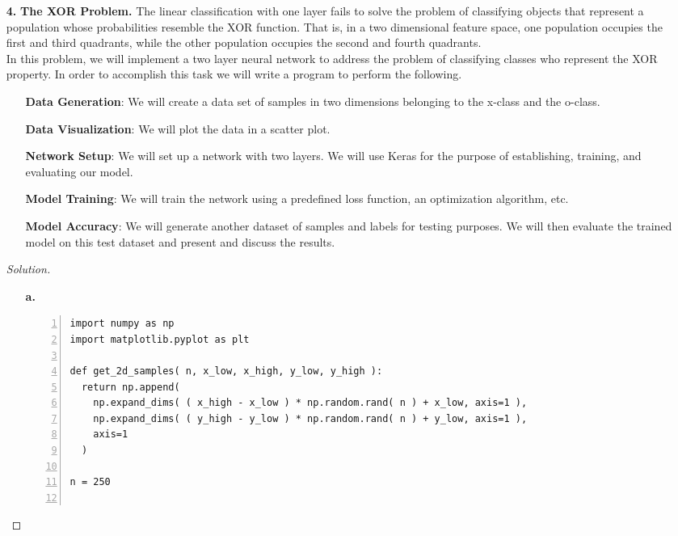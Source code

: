 \documentclass[ 12pt ]{article}
\begin{document}
\begin{enumerate}
	\item[\textbf{4.}] \textbf{The XOR Problem.} The linear classification with one layer fails to solve the problem of classifying objects that represent a population whose probabilities
		resemble the XOR function. That is, in a two dimensional feature space, one population occupies the first and third quadrants, while the other population occupies the second and
		fourth quadrants. \\
		In this problem, we will implement a two layer neural network to address the problem of classifying classes who represent the XOR property. In order to accomplish this task we
		will write a program to perform the following.
		\begin{enumerate}
			\item[] \textbf{Data Generation}: We will create a data set of samples in two dimensions belonging to the x-class and the o-class.
			\item[] \textbf{Data Visualization}: We will plot the data in a scatter plot.
			\item[] \textbf{Network Setup}: We will set up a network with two layers. We will use Keras for the purpose of establishing, training, and evaluating our model.
			\item[] \textbf{Model Training}: We will train the network using a predefined loss function, an optimization algorithm, etc.
			\item[] \textbf{Model Accuracy}: We will generate another dataset of samples and labels for testing purposes. We will then evaluate the trained model on this test dataset and
				present and discuss the results.
		\end{enumerate}

		\begin{proof}[Solution] $ $
			\begin{enumerate}
				\item[\textbf{a.}] $ $
					\begin{lstlisting}[basicstyle=\ttfamily\footnotesize, numbers=left, tabsize=4, frame=single, breaklines=true, postbreak=\mbox{\textcolor{red}{$\hookrightarrow$}\space}]
import numpy as np
import matplotlib.pyplot as plt

def get_2d_samples( n, x_low, x_high, y_low, y_high ):
  return np.append(
    np.expand_dims( ( x_high - x_low ) * np.random.rand( n ) + x_low, axis=1 ),
    np.expand_dims( ( y_high - y_low ) * np.random.rand( n ) + y_low, axis=1 ),
    axis=1
  )

n = 250


\end{lstlisting}
\end{enumerate}
\end{proof}
\end{enumerate}
\end{document}
